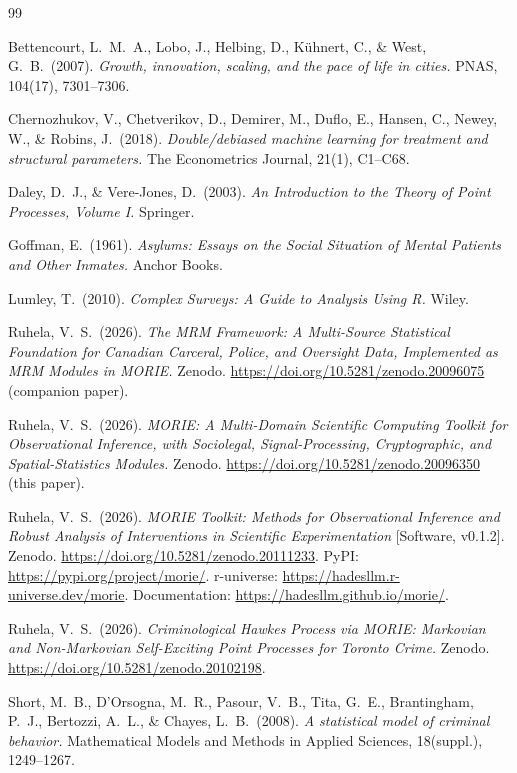 \documentclass[11pt,a4paper]{article}
\theoremstyle{plain}
\theoremstyle{definition}
\theoremstyle{remark}
\begin{document}

\begin{thebibliography}{99}

Bettencourt, L.\ M.\ A., Lobo, J., Helbing, D., K\"uhnert, C., \&
West, G.\ B.\ (2007).
\emph{Growth, innovation, scaling, and the pace of life in
cities.}
PNAS, 104(17), 7301--7306.

Chernozhukov, V., Chetverikov, D., Demirer, M., Duflo, E.,
Hansen, C., Newey, W., \& Robins, J.\ (2018).
\emph{Double/debiased machine learning for treatment and
structural parameters.}
The Econometrics Journal, 21(1), C1--C68.

Daley, D.\ J., \& Vere-Jones, D.\ (2003).
\emph{An Introduction to the Theory of Point Processes,
Volume I.} Springer.

Goffman, E.\ (1961).
\emph{Asylums: Essays on the Social Situation of Mental Patients
and Other Inmates.} Anchor Books.

Lumley, T.\ (2010).
\emph{Complex Surveys: A Guide to Analysis Using R.} Wiley.

Ruhela, V.\ S.\ (2026).
\emph{The MRM Framework: A Multi-Source Statistical Foundation for
Canadian Carceral, Police, and Oversight Data, Implemented as MRM
Modules in MORIE.}
Zenodo. \url{https://doi.org/10.5281/zenodo.20096075}
(companion paper).

Ruhela, V.\ S.\ (2026).
\emph{MORIE: A Multi-Domain Scientific Computing Toolkit for
Observational Inference, with Sociolegal, Signal-Processing,
Cryptographic, and Spatial-Statistics Modules.}
Zenodo. \url{https://doi.org/10.5281/zenodo.20096350} (this paper).

Ruhela, V.\ S.\ (2026).
\emph{MORIE Toolkit: Methods for Observational Inference and
Robust Analysis of Interventions in Scientific Experimentation}
[Software, v0.1.2].
Zenodo. \url{https://doi.org/10.5281/zenodo.20111233}.
PyPI: \url{https://pypi.org/project/morie/}.
r-universe: \url{https://hadesllm.r-universe.dev/morie}.
Documentation: \url{https://hadesllm.github.io/morie/}.

Ruhela, V.\ S.\ (2026).
\emph{Criminological Hawkes Process via MORIE: Markovian and
Non-Markovian Self-Exciting Point Processes for Toronto Crime.}
Zenodo. \url{https://doi.org/10.5281/zenodo.20102198}.

Short, M.\ B., D'Orsogna, M.\ R., Pasour, V.\ B., Tita, G.\ E.,
Brantingham, P.\ J., Bertozzi, A.\ L., \& Chayes, L.\ B.\ (2008).
\emph{A statistical model of criminal behavior.}
Mathematical Models and Methods in Applied Sciences, 18(suppl.),
1249--1267.


\end{thebibliography}
\end{document}
